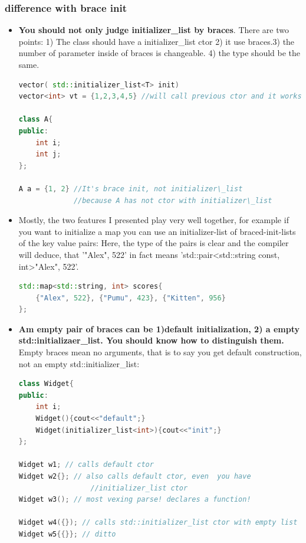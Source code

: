 \documentclass[a4paper,12pt,twoside]{book}
\begin{document}
\subsubsection{difference with brace init}
\begin{itemize}
	\item  \textbf{You should not only judge initializer\_list by braces}. There are two points: 1) The class should have a initializer\_list ctor 2) it use braces.3) the number of parameter inside of braces is changeable. 4) the type should be the same.
\begin{lstlisting}[frame=single, language=c++,mathescape=true]
vector( std::initializer_list<T> init)
vector<int> vt = {1,2,3,4,5} //will call previous ctor and it works. 
	
class A{
public:
	int i;
	int j;
};
	
A a = {1, 2} //It's brace init, not initializer\_list
             //because A has not ctor with initializer\_list
\end{lstlisting}
	
	\item Mostly, the two features I presented play very well together, for example if you want to initialize a map you can use an initializer-list of braced-init-lists of the key value pairs: Here, the type of the pairs is clear and the compiler will deduce, that '{"Alex", 522}' in fact means 'std::pair<std::string const, int>{"Alex", 522}'.
	
\begin{lstlisting}[frame=single, language=c++,mathescape=true]
std::map<std::string, int> scores{ 
	{"Alex", 522}, {"Pumu", 423}, {"Kitten", 956} 
};
\end{lstlisting}
	
	\item \textbf{Am empty pair of braces can be 1)default initialization, 2) a empty std::initializaer\_list. You should know how to distinguish them. } Empty braces mean no arguments, that is to say you get default construction, not an empty std::initializer\_list:
\begin{lstlisting}[frame=single, language=c++,mathescape=true]
class Widget{
public:
	int i;
	Widget(){cout<<"default";}
	Widget(initializer_list<int>){cout<<"init";}
};
	
Widget w1; // calls default ctor
Widget w2{}; // also calls default ctor, even  you have 
	             //initializer_list ctor
Widget w3(); // most vexing parse! declares a function!
	
Widget w4({}); // calls std::initializer_list ctor with empty list
Widget w5{{}}; // ditto
\end{lstlisting}
	
	\end{itemize}
	
\end{document}

